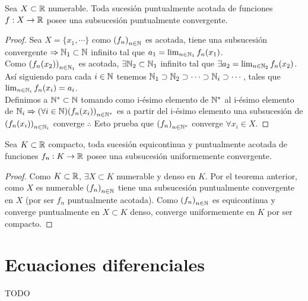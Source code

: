 \begin{theorem}
  Sea \(X \subset \mathbb{R} \) numerable. Toda sucesión puntualmente acotada de funciones \(f: X \to \mathbb{R} \) posee una subsucesión puntualmente convergente.
  \begin{proof}
    Sea \(X = \{x_1, \cdots \} \) como \({(f_n)}_{n \in \mathbb{N}} \) es acotada, tiene una subsucesión convergente \(\Rightarrow \mathbb{N}_1 \subset \mathbb{N} \) infinito tal que \(a_1 = \lim_{n \in \mathbb{N}_1} f_n(x_1)\). \\
    Como \({(f_n(x_2))}_{n \in \mathbb{N}_1} \) es acotada, \(\exists \mathbb{N}_2 \subset \mathbb{N}_1\) infinito tal que \(\exists a_2 = \lim_{n \in \mathbb{N}_2} f_n(x_2)\). Así siguiendo para cada \(i \in \mathbb{N} \) tenemos \(\mathbb{N}_1 \supset \mathbb{N}_2 \supset \cdots \supset \mathbb{N}_i \supset \cdots \), tales que \(\lim_{n \in \mathbb{N}_i} f_n(x_i) = a_i\). \\
    Definimos a \(\mathbb{N}^* \subset \mathbb{N} \) tomando como i-ésimo elemento de \(\mathbb{N}^*\) al i-ésimo elemento de \(\mathbb{N}_i \Rightarrow (\forall i \in \mathbb{N}) {(f_n(x_i))}_{n \in \mathbb{N}^*} \) es a partir del i-ésimo elemento una subsucesión de \({(f_n(x_i))}_{n \in \mathbb{N}_i} \) converge \(\therefore \) Esto prueba que \({(f_n)}_{n \in \mathbb{N}^*} \) converge \(\forall x_i \in X\).
  \end{proof}
\end{theorem}

\begin{theorem}
  Sea \(K \subset \mathbb{R} \) compacto, toda sucesión equicontinua y puntualmente acotada de funciones \(f_n: K \to \mathbb{R} \) posee una subsucesión uniformemente convergente.
  \begin{proof}
    Como \(K \subset \mathbb{R} \), \(\exists X \subset K\) numerable y denso en \(K\). Por el teorema anterior, como \(X\) es numerable \({(f_n)}_{n \in \mathbb{N}} \) tiene una subsucesión puntualmente convergente en \(X\) (por ser \(f_n\) puntualmente acotada). Como \({(f_n)}_{n \in \mathbb{N}} \) es equicontinua y converge puntualmente en \(X \subset K\) denso, converge uniformemente en \(K\) por ser compacto.
  \end{proof}
\end{theorem}

\section{Ecuaciones diferenciales}
TODO
